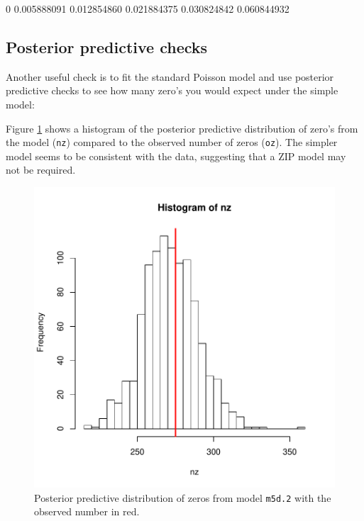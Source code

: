 \documentclass{article}
\begin{document}
\begin{Schunk}
\begin{Soutput}
         0%
0.005888091 0.012854860 0.021884375 0.030824842 0.060844932 
\end{Soutput}
\end{Schunk}

\subsection{Posterior predictive checks}

Another useful check is to fit the standard Poisson model and use posterior predictive checks to see how many zero's you would expect under the simple model:

\begin{Schunk}
\end{Schunk}

Figure \ref{PPZIP}  shows a histogram of the posterior predictive distribution of zero's from the model (\texttt{nz}) compared to the observed number of zeros (\texttt{oz}). The simpler model seems to be consistent with the data, suggesting that a ZIP model may not be required.


\begin{figure}[!h]
\begin{center}
\includegraphics{Lecture5-043}
\end{center}
\caption{Posterior predictive distribution of zeros from model \texttt{m5d.2} with the observed number in red.}
\label{PPZIP}
\end{figure}


\ifalone
\end{document}
